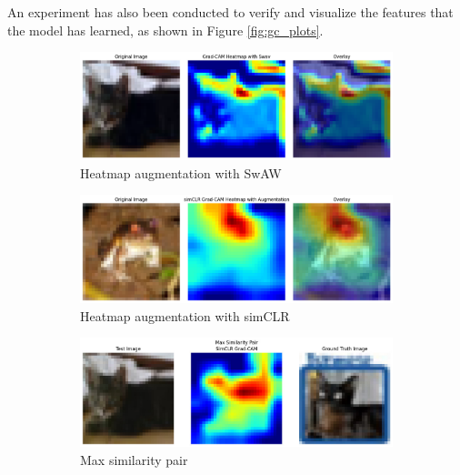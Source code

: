 An experiment has also been conducted to verify and visualize the features that the model has learned, as shown in Figure \ref{fig:gc_plots}.
\begin{figure}[h]
    \centering
    \begin{subfigure}{\linewidth}
        \includegraphics[width=\linewidth]{images/gc1.png}
        \caption{Heatmap augmentation with SwAW}
        \label{fig:gc1}
    \end{subfigure}\vspace{10pt}
    \begin{subfigure}{\linewidth}
        \includegraphics[width=\linewidth]{images/gc2.png}
        \caption{Heatmap augmentation with simCLR}
        \label{fig:gc2}
    \end{subfigure}\vspace{10pt}
    \begin{subfigure}{\linewidth}
        \includegraphics[width=\linewidth]{images/gc3.jpeg}
        \caption{Max similarity pair} 
        \label{fig:gc3}
    \end{subfigure}\vspace{10pt}
    \begin{subfigure}{\linewidth}

\end{subfigure}
\end{figure}
